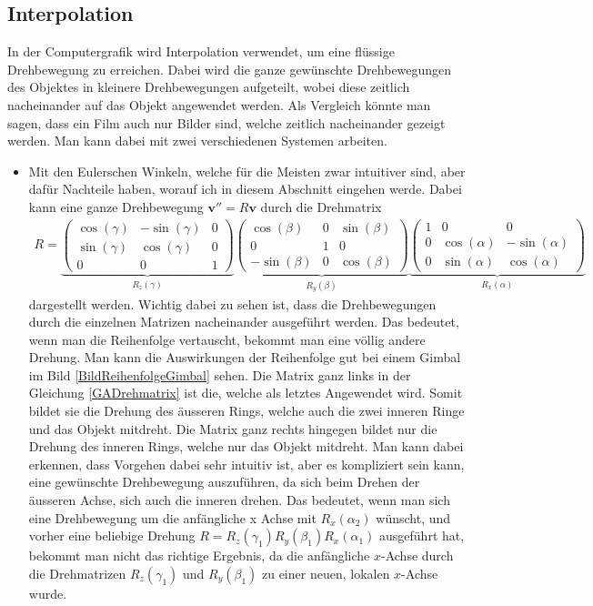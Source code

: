 \subsection{Interpolation}
In der Computergrafik wird Interpolation verwendet, um eine flüssige Drehbewegung zu erreichen. Dabei wird die ganze gewünschte Drehbewegungen des Objektes in kleinere Drehbewegungen aufgeteilt, wobei diese zeitlich nacheinander auf das Objekt angewendet werden. Als Vergleich könnte man sagen, dass ein Film auch nur Bilder sind, welche zeitlich nacheinander gezeigt werden. Man kann dabei mit zwei verschiedenen Systemen arbeiten. 
\begin{itemize}
	\item Mit den Eulerschen Winkeln, welche für die Meisten zwar intuitiver sind, aber dafür Nachteile haben, worauf ich in diesem Abschnitt eingehen werde. Dabei kann eine ganze Drehbewegung $\mathbf{v}'' = R\mathbf{v}$ durch die Drehmatrix
	\begin{align} \label{GADrehmatrix}
	R = 
	\underbrace{
		\begin{pmatrix} 
		\cos(\gamma) & -\sin(\gamma) & 0\\ \sin(\gamma) & \cos(\gamma) & 0 \\ 0 & 0 & 1 
		\end{pmatrix}
	}_{\displaystyle{R_z(\gamma)}}
	\underbrace{
		\begin{pmatrix}
		\cos(\beta) &  0 & \sin(\beta)\\ 0 & 1 & 0 \\ -\sin(\beta) & 0 & \cos(\beta)
		\end{pmatrix}
	}_{\displaystyle{R_y(\beta)}}
	\underbrace{
		\begin{pmatrix} 
		1 & 0 & 0 \\ 0 & \cos(\alpha) & -\sin(\alpha)\\ 0 & \sin(\alpha) & \cos(\alpha)
		\end{pmatrix}
	}_{\displaystyle{R_x(\alpha)}}
	\end{align}
	dargestellt werden. Wichtig dabei zu sehen ist, dass die Drehbewegungen durch die einzelnen Matrizen nacheinander ausgeführt werden. Das bedeutet, wenn man die Reihenfolge vertauscht, bekommt man eine völlig andere Drehung. Man kann die Auswirkungen der Reihenfolge gut bei einem Gimbal im Bild \ref{BildReihenfolgeGimbal} sehen. Die Matrix ganz links in der Gleichung \eqref{GADrehmatrix} ist die, welche als letztes Angewendet wird. Somit bildet sie die Drehung des äusseren Rings, welche auch die zwei inneren Ringe und das Objekt mitdreht. Die Matrix ganz rechts hingegen bildet nur die Drehung des inneren Rings, welche nur das Objekt mitdreht. Man kann dabei erkennen, dass Vorgehen dabei sehr intuitiv ist, aber es kompliziert sein kann, eine gewünschte Drehbewegung auszuführen, da sich beim Drehen der äusseren Achse, sich auch die inneren drehen. Das bedeutet, wenn man sich eine Drehbewegung um die anfängliche x Achse mit $R_x(\alpha_2)$ wünscht, und vorher eine beliebige Drehung $R = R_z(\gamma_1) R_y(\beta_1) R_x(\alpha_1)$ ausgeführt hat, bekommt man nicht das richtige Ergebnis, da die anfängliche $x$-Achse durch die Drehmatrizen $R_z(\gamma_1)$ und $R_y(\beta_1)$ zu einer neuen, lokalen $x$-Achse wurde. 

\end{itemize}
